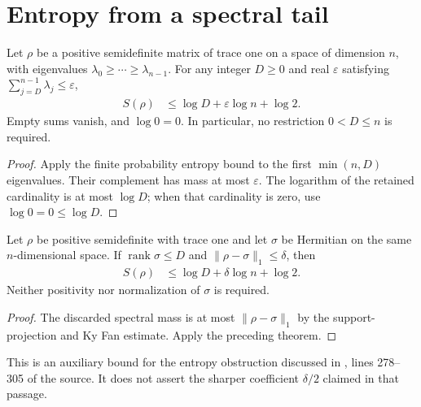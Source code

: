\section{Entropy from a spectral tail}
\label{sec:von_neumann_spectral_tail}

\begin{theorem}
  \label{thm:von_neumann_spectral_tail}
  \leanok
  Let $\rho$ be a positive semidefinite matrix of trace one on a space of
  dimension $n$, with eigenvalues $\lambda_0\ge\cdots\ge\lambda_{n-1}$.
  For any integer $D\ge0$ and real $\varepsilon$ satisfying
  $\sum_{j=D}^{n-1}\lambda_j\le\varepsilon$,
  \begin{align}
    \label{eq:von_neumann_spectral_tail}
    S(\rho)&\le\log D+\varepsilon\log n+\log2.
  \end{align}
  Empty sums vanish, and $\log0=0$. In particular, no restriction
  $0<D\le n$ is required.
\end{theorem}
\begin{proof}\leanok
  Apply the finite probability entropy bound to the first $\min(n,D)$
  eigenvalues. Their complement has mass at most $\varepsilon$.
  The logarithm of the retained cardinality is at most $\log D$;
  when that cardinality is zero, use $\log0=0\le\log D$.
\end{proof}

\begin{theorem}
  \label{thm:von_neumann_low_rank_error}
  \leanok
  Let $\rho$ be positive semidefinite with trace one and let $\sigma$ be
  Hermitian on the same $n$-dimensional space. If
  $\operatorname{rank}\sigma\le D$ and $\|\rho-\sigma\|_1\le\delta$, then
  \begin{align}
    \label{eq:von_neumann_low_rank_error}
    S(\rho)&\le\log D+\delta\log n+\log2.
  \end{align}
  Neither positivity nor normalization of $\sigma$ is required.
\end{theorem}
\begin{proof}\leanok
  The discarded spectral mass is at most $\|\rho-\sigma\|_1$ by the
  support-projection and Ky Fan estimate. Apply the preceding theorem.
\end{proof}

This is an auxiliary bound for the entropy obstruction discussed in
\cite{Schuch2008EntropyScaling}, lines 278--305 of the source.
It does not assert the sharper coefficient $\delta/2$ claimed in that passage.
